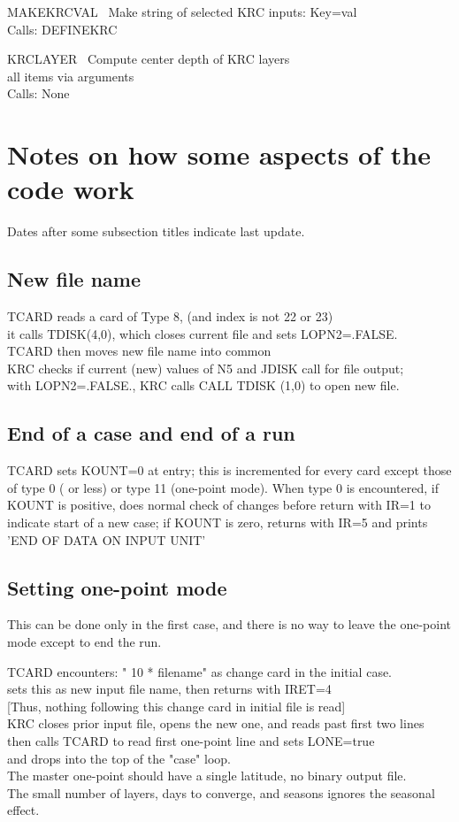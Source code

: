 \documentclass{article}
\newcommand{\qi}{\\ \hspace*{2.em}}      %
\newcommand{\qii}{\\ \hspace*{4.em}}     %
\begin{document}
MAKEKRCVAL \ Make string of selected KRC inputs: Key=val \\
Calls: DEFINEKRC

KRCLAYER \ Compute center depth of KRC layers \\
 all items via arguments \\
Calls: None


\section{Notes on how some aspects of the code work} %
Dates after some subsection titles indicate last update.

\subsection{New file name}%
TCARD reads a card of Type 8, (and index is not 22 or 23)
\qi it calls  TDISK(4,0), which closes current file and sets  LOPN2=.FALSE.
\qii   TCARD then moves new file name into common \\
KRC checks if current (new) values of N5 and JDISK call for file output;
\qi  with  LOPN2=.FALSE., KRC calls CALL TDISK (1,0) to open new file.

\subsection{End of a case and end of a run}%
TCARD sets KOUNT=0 at entry; this is incremented for every card except those of
type 0 ( or less) or type 11 (one-point mode). When type 0 is encountered, if
KOUNT is positive, does normal check of changes before return with IR=1 to
indicate start of a new case; if KOUNT is zero, returns with IR=5 and prints
'END OF DATA ON INPUT UNIT'

\subsection{Setting one-point mode}%
This can be done only in the first case, and there is no way to leave the 
one-point mode except to end the run.

TCARD encounters: " 10 * filename" as change card in the initial case.
\qi   sets this as new input file name, then returns with IRET=4 
\qi  [Thus, nothing following this change card in initial file is read] \\
KRC closes prior input file, opens the new one, and reads past first two lines 
\qi     then calls TCARD to read first one-point line and sets LONE=true
\qi     and drops into the top of the "case" loop. \\ 
The master one-point should have a single latitude, no binary output file. \\
The small number of layers, days to converge, and seasons ignores the seasonal 
effect.
\end{document}
